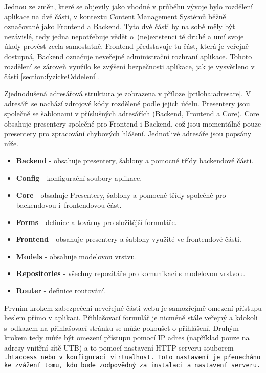 Jednou ze změn, které se objevily jako vhodné v průběhu vývoje bylo rozdělení aplikace na dvě části, v kontextu Content Management Systémů běžně označované jako Frontend a Backend. Tyto dvě části by na sobě měly být nezávislé, tedy jedna nepotřebuje vědět o~(ne)existenci té druhé a umí svoje úkoly provést zcela samostatně. Frontend představuje tu část, která je veřejně dostupná, Backend označuje neveřejné administrační rozhraní aplikace. Tohoto rozdělení se zároveň využilo ke zvýšení bezpečnosti aplikace, jak je vysvětleno v části \ref{section:fyzickeOddeleni}.

\bigskip

Zjednodušená adresářová struktura je zobrazena v příloze \ref{priloha:adresare}. V adresáři  se nachází zdrojové kódy rozdělené podle jejich účelu. Presentery jsou společně se šablonami v příslušných adresářích (Backend, Frontend a Core). Core obsahuje presentery společné pro Frontend i Backend, což jsou momentálně pouze presentery pro zpracování chybových hlášení. Jednotlivé adresáře jsou popsány níže.

\clearpage

\begin{itemize}
	\item  \textbf{Backend} - obsahuje presentery, šablony a pomocné třídy backendové části.
	\item \textbf{Config} - konfigurační soubory aplikace.
	\item \textbf{Core} - obsahuje Presentery, šablony a pomocné třídy společné pro backendovou i~frontendovou část.
	\item \textbf{Forms} - definice a továrny pro složitější formuláře.
	\item \textbf{Frontend} - obsahuje presentery a šablony využité ve frontendové části.
	\item \textbf{Models} - obsahuje modelovou vrstvu.
	\item \textbf{Repositories} - všechny repozitáře pro komunikaci s modelovou vrstvou.
	\item \textbf{Router} - definice routování.
\end{itemize}

 \label{section:fyzickeOddeleni}
Prvním krokem zabezpečení neveřejné části webu je samozřejmě omezení přístupu heslem přímo v aplikaci. Přihlašovací formulář je nicméně stále veřejný a kdokoli s~odkazem na přihlašovací stránku se může pokoušet o přihlášení. Druhým krokem tedy může být omezení přístupu pomocí IP adres (například pouze na adresy vnitřní sítě UTB) a to pomocí nastavení HTTP serveru souborem \tt{.htaccess} nebo v~konfiguraci \tt{virtualhost}. Toto nastavení je přenecháno ke zvážení tomu, kdo bude zodpovědný za instalaci a nastavení serveru.


